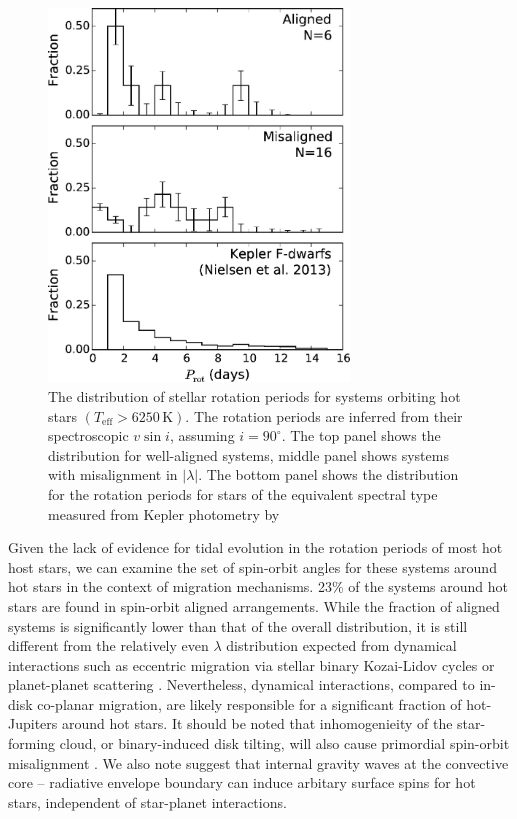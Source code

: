 \documentclass[useAMS,usenatbib]{mn2e}
\begin{document}
\begin{figure}
  \includegraphics[width=8cm]{plots/prot_hist.eps}
  
  \caption{\label{fig:prot_hist}The distribution of stellar rotation periods for systems orbiting hot stars $(T_\text{eff}>6250\,\text{K})$. The rotation periods are inferred from their spectroscopic $v\sin i$, assuming $i=90^\circ$. The top panel shows the distribution for well-aligned systems, middle panel shows systems with misalignment in $|\lambda|$. The bottom panel shows the distribution for the rotation periods for stars of the equivalent spectral type measured from Kepler photometry by \citet{2013A&amp;A...557L..10N}}
\end{figure}

Given the lack of evidence for tidal evolution in the rotation periods of most hot host stars, we can examine the set of spin-orbit angles for these systems around hot stars in the context of migration mechanisms. 23\% of the systems around hot stars are found in spin-orbit aligned arrangements. While the fraction of aligned systems is significantly lower than that of the overall distribution, it is still different from the relatively even $\lambda$ distribution expected from dynamical interactions such as eccentric migration via stellar binary Kozai-Lidov cycles \citep[e.g.][]{2012ApJ...754L..36N,2015ApJ...799...27P} or planet-planet scattering \citep[e.g.][]{2011ApJ...742...72N}. Nevertheless, dynamical interactions, compared to in-disk co-planar migration, are likely responsible for a significant fraction of hot-Jupiters around hot stars. It should be noted that inhomogenieity of the star-forming cloud, or binary-induced disk tilting, will also cause primordial spin-orbit misalignment \citep{2010MNRAS.401.1505B,2012Natur.491..418B}. We also note \citet{2012ApJ...758L...6R} suggest that internal gravity waves at the convective core -- radiative envelope boundary can induce arbitary surface spins for hot stars, independent of star-planet interactions.
\end{document}
